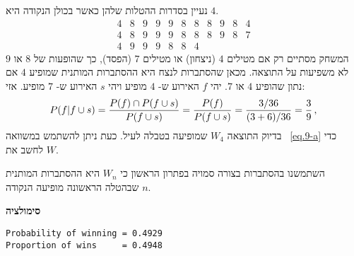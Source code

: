 
נעיין בסדרות ההטלות שלהן כאשר בכולן הנקודה היא
$4$. 
\[
\begin{array}{rrrrrrrrrrr}
4 & 8 & 9 & 9 & 9 & 8 & 8 & 8 & 9 & 8 & 4\\
4 & 8 & 9 & 9 & 9 & 8 & 8 & 8 & 9 & 8 & 7\\
4 & 9 & 9 & 9 & 8 & 8 & 4
\end{array}
\]
המשחק מסתיים רק אם מטילים 
$4$
(ניצחון) או מטילים
$7$
(הפסד), כך שהופעות של 
$8$
או
$9$
לא משפיעות על התוצאה. מכאן שהסתברות לנצח היא ההסתברות המותנית שמופיע
$4$
אם נתון שהופיע
$4$
או
$7$. 
יהי 
$f$
האירוע ש-%
$4$
מופיע ויהי
$s$
האירוע ש-%
$7$
מופיע. אזי:
\[
P(f|f\cup s) = \displaystyle\frac{P(f)\cap P(f\cup s)}{P(f\cup s)}=\displaystyle\frac{P(f)}{P(f\cup s)}=\displaystyle\frac{3/36}{(3+6)/36}=\displaystyle\frac{3}{9}\,,
\]
בדיוק התוצאה 
$W_4$
שמופיעה בטבלה לעיל. כעת ניתן להשתמש במשוואה%
~\ref{eq.9-a}
כדי לחשב את
$W$.

השתמשנו בהסתברות בצורה סמויה בפתרון הראשון כי 
$W_n$
היא ההסתברות המותנית שבהטלה הראשונה מופיעה הנקודה
$n$.

\textbf{סימולציה}
\begin{verbatim}
Probability of winning = 0.4929
Proportion of wins     = 0.4948
\end{verbatim}


